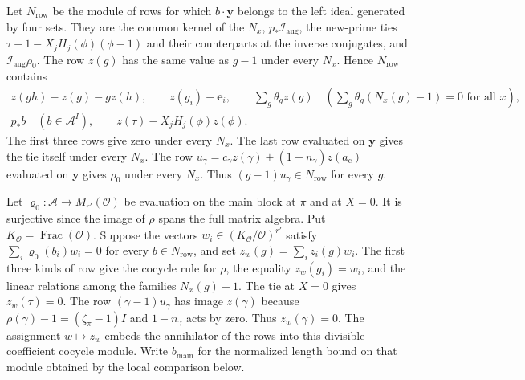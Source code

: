 Let \(N_\mathrm{row}\) be the module of rows for which \(b\cdot\mathbf y\)
belongs to the left ideal generated by four sets. They are the
common kernel of the \(N_x\), \(p_\ast\mathcal I_\mathrm{aug}\),
the new-prime ties \(\tau-1-X_jH_j(\phi)(\phi-1)\) and their
counterparts at the inverse conjugates, and
\(\mathcal I_\mathrm{aug}\rho_0\).
The row \(z(g)\) has the same value as \(g-1\) under every \(N_x\).
Hence \(N_\mathrm{row}\) contains
\[
 \begin{gathered}
 z(gh)-z(g)-g z(h),\qquad z(g_i)-\mathbf e_i,\qquad
 \sum_g\theta_g z(g)\quad
     \left(\sum_g\theta_g (N_x(g)-1)=0\text{ for all }x\right),\\
 p_\ast b\quad (b\in\mathcal A^I),\qquad
 z(\tau)-X_jH_j(\phi)z(\phi).
 \end{gathered}
\]
The first three rows give zero under every \(N_x\). The last row
evaluated on \(\mathbf y\) gives the tie itself under every \(N_x\).
The row \(u_\gamma=c_\gamma z(\gamma)+(1-n_\gamma)z(a_{\mathrm c})\)
evaluated on \(\mathbf y\) gives \(\rho_0\) under every \(N_x\).
Thus \((g-1)u_\gamma\in N_\mathrm{row}\) for every \(g\).

Let \(\varrho_0\colon\mathcal A\to M_{r'}(\mathcal O)\) be evaluation
on the main block at \(\pi\) and at \(X=0\). It is surjective since the
image of \(\rho\) spans the full matrix algebra. Put
\(K_{\mathcal O}=\operatorname{Frac}(\mathcal O)\).
Suppose the vectors \(w_i\in(K_{\mathcal O}/\mathcal O)^{r'}\)
satisfy \(\sum_i\varrho_0(b_i)w_i=0\) for every \(b\in N_\mathrm{row}\),
and set \(z_w(g)=\sum_i z_i(g)w_i\).
The first three kinds of row give the cocycle rule for \(\rho\),
the equality \(z_w(g_i)=w_i\), and the linear relations among the
families \(N_x(g)-1\). The tie at \(X=0\) gives \(z_w(\tau)=0\).
The row \((\gamma-1)u_\gamma\) has image \(z(\gamma)\) because
\(\rho(\gamma)-1=(\zeta_\pi-1)I\) and \(1-n_\gamma\) acts by zero.
Thus \(z_w(\gamma)=0\). The assignment \(w\mapsto z_w\) embeds
the annihilator of the rows into this divisible-coefficient cocycle
module. Write \(b_{\mathrm{main}}\) for the normalized length bound on that
module obtained by the local comparison below.

